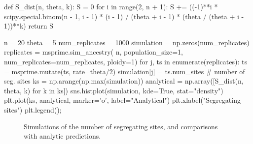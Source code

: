 \documentclass[graybox]{svmult}
\begin{document}
\begin{pythoncode}
def S_dist(n, theta, k):
    S = 0
    for i in range(2, n + 1):
        S += ((-1)**i * scipy.special.binom(n - 1, i - 1)
              * (i - 1) / (theta + i - 1)
              * (theta / (theta + i - 1))**k)
    return S

n = 20
theta = 5
num_replicates = 1000
simulation = np.zeros(num_replicates)
replicates = msprime.sim_ancestry(
    n, population_size=1, num_replicates=num_replicates, ploidy=1)
for j, ts in enumerate(replicates):
    ts = msprime.mutate(ts, rate=theta/2)
    simulation[j] = ts.num_sites  # number of seg. sites
ks = np.arange(np.max(simulation))
analytical = np.array([S_dist(n, theta, k) for k in ks])
sns.histplot(simulation, kde=True,
    stat="density")
plt.plot(ks, analytical, marker='o', label="Analytical")
plt.xlabel("Segregating sites")
plt.legend();
\end{pythoncode}

\begin{figure}[t]
\centering
{}
\qquad\qquad
{}
\caption{\label{fig-segsites}
Simulations of the number of segregating sites, and
comparisons with analytic predictions.
}
\end{figure}
\end{document}
